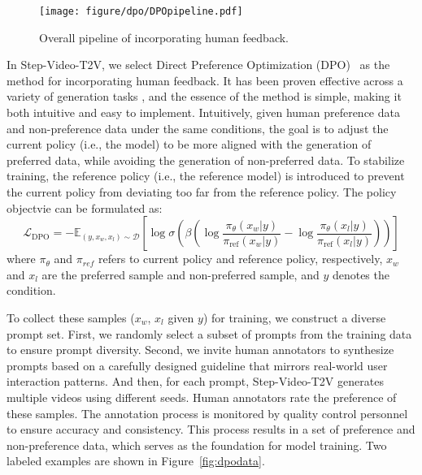 
\begin{figure*}[t]
    \centering
    \texttt{[image: figure/dpo/DPOpipeline.pdf]}
    \caption{Overall pipeline of incorporating human feedback. }
    \label{fig:dpopipe}
\end{figure*}


In Step-Video-T2V, we select Direct Preference Optimization (DPO)~\cite{rafailov2024direct} as the method for incorporating human feedback. It has been proven effective across a variety of generation tasks \cite{wallace2024diffusion, yang2024using}, and the essence of the method is simple, making it both intuitive and easy to implement. Intuitively, given human preference data and non-preference data under the same conditions, the goal is to adjust the current policy (i.e., the model) to be more aligned with the generation of preferred data, while avoiding the generation of non-preferred data. To stabilize training, the reference policy (i.e., the reference model) is introduced to prevent the current policy from deviating too far from the reference policy. The policy objectvie can be formulated as:
\begin{equation}\label{eq:dpo_loss}
\mathcal{L}_{\text{DPO}} = -\mathbb{E}_{(y, x_w, x_l) \sim \mathcal{D}} \left[ 
\log \sigma \left( 
\beta \left( 
\log \frac{\pi_\theta(x_w|y)}{\pi_{\text{ref}}(x_w|y)} 
- \log \frac{\pi_\theta(x_l|y)}{\pi_{\text{ref}}(x_l|y)}
\right)
\right)
\right]
\end{equation}
where $\pi_\theta$ and $\pi_{ref}$ refers to current policy and reference policy, respectively, $x_w$ and $x_l$ are the preferred sample and non-preferred sample, and $y$ denotes the condition. 

To collect these samples ($x_w$, $x_l$ given $y$) for training, we construct a diverse prompt set. First, we randomly select a subset of prompts from the training data to ensure prompt diversity. Second, we invite human annotators to synthesize prompts based on a carefully designed guideline that mirrors real-world user interaction patterns. And then, for each prompt, Step-Video-T2V generates multiple videos using different seeds. Human annotators rate the preference of these samples. The annotation process is monitored by quality control personnel to ensure accuracy and consistency. This process results in a set of preference and non-preference data, which serves as the foundation for model training. Two labeled examples are shown in Figure~\ref{fig:dpodata}. 

